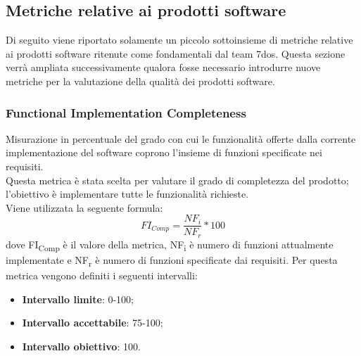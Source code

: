 \subsection{Metriche relative ai prodotti software}
Di seguito viene riportato solamente un piccolo sottoinsieme di metriche relative ai prodotti software ritenute come fondamentali dal team 7dos.
Questa sezione verrà ampliata successivamente qualora fosse necessario introdurre nuove metriche per la valutazione della qualità dei prodotti software. 
\subsubsection{Functional Implementation Completeness}
Misurazione in percentuale del grado con cui le funzionalità offerte dalla corrente implementazione del software coprono l'insieme di funzioni specificate nei requisiti.\\
Questa metrica è stata scelta per valutare il grado di completezza del prodotto; l'obiettivo è implementare tutte le funzionalità richieste.\\
Viene utilizzata la seguente formula:
$$FI_{Comp}=\frac{NF_i}{NF_r}*100$$
dove FI\textsubscript{Comp} è il valore della metrica, NF\textsubscript{i} è numero di funzioni attualmente implementate e NF\textsubscript{r} è numero di funzioni specificate dai requisiti.
Per questa metrica vengono definiti i seguenti intervalli: 
\begin{itemize}
	\item{\textbf{Intervallo limite}: 0-100;}
	\item{\textbf{Intervallo accettabile}: 75-100;}
	\item{\textbf{Intervallo obiettivo}: 100.}
\end{itemize}

